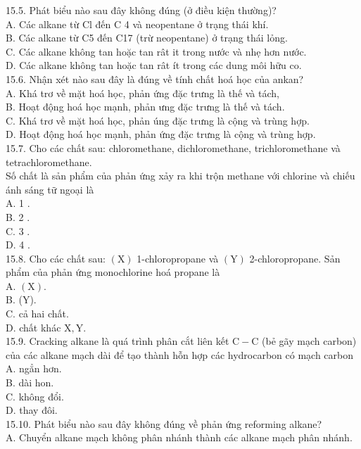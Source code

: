 \documentclass[10pt]{article}
\begin{document}
15.5. Phát biểu nào sau đây không đúng (ở điều kiện thường)?\\
A. Các alkane từ Cl đến C 4 và neopentane ở trạng thái khí.\\
B. Các alkane từ C5 đến C17 (trừ neopentane) ở trạng thái lỏng.\\
C. Các alkane không tan hoặc tan rât it trong nước và nhẹ hơn nước.\\
D. Các alkane không tan hoặc tan rât ít trong các dung môi hữu co.\\
15.6. Nhận xét nào sau đây là đúng về tính chất hoá học của ankan?\\
A. Khá trơ về mặt hoá học, phản ứng đặc trưng là thế và tách,\\
B. Hoạt động hoá học mạnh, phản ưng đặc trưng là thế và tách.\\
C. Khá trơ về mặt hoá học, phản úng đặc trưng là cộng và trùng hợp.\\
D. Hoạt động hoá học mạnh, phản ứng đặc trưng là cộng và trùng hợp.\\
15.7. Cho các chất sau: chloromethane, dichloromethane, trichloromethane và tetrachloromethane.\\
Số chất là sản phẩm của phản ứng xảy ra khi trộn methane với chlorine và chiếu ánh sáng tữ ngoại là\\
A. 1 .\\
B. 2 .\\
C. 3 .\\
D. 4 .\\
15.8. Cho các chất sau: $(\mathrm{X})$ 1-chloropropane và $(\mathrm{Y})$ 2-chloropropane. Sản phẩm của phản ứng monochlorine hoá propane là\\
A. $(\mathrm{X})$.\\
B. (Y).\\
C. cả hai chất.\\
D. chất khác $\mathrm{X}, \mathrm{Y}$.\\
15.9. Cracking alkane là quá trình phân cắt liên kết $\mathrm{C}-\mathrm{C}$ (bẻ gãy mạch carbon) của các alkane mạch dài để tạo thành hỗn hợp các hydrocarbon có mạch carbon\\
A. ngẳn hơn.\\
B. dài hon.\\
C. không đổi.\\
D. thay đôi.\\
15.10. Phát biểu nào sau đây không đúng về phản ứng reforming alkane?\\
A. Chuyển alkane mạch không phân nhánh thành các alkane mạch phân nhánh.\\
\end{document}
